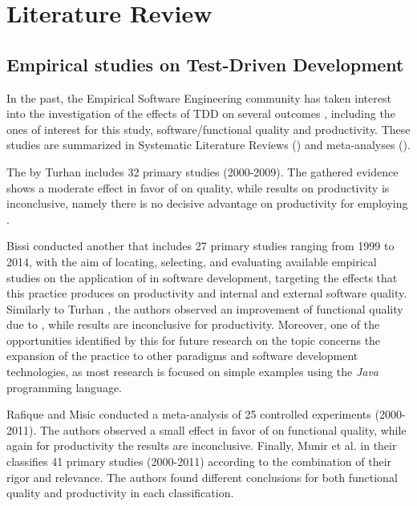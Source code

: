 \chapter{Literature Review}
\section{Empirical studies on Test-Driven Development}
In the past, the Empirical Software Engineering community has taken interest into the investigation of the effects of TDD on several outcomes \cite{DBLP:conf/esem/FucciS0SSUTJO16} \cite{DBLP:journals/tse/ErdogmusMT05} \cite{DBLP:journals/infsof/Madeyski10}, including the ones of interest for this study, \ie software/functional quality and productivity. These studies are summarized in Systematic Literature Reviews (\slrs) and meta-analyses (\eg \cite{DBLP:journals/infsof/BissiNE16, DBLP:journals/infsof/MunirMP14, DBLP:journals/tse/RafiqueM13, TDDEffective}).

The \slr by Turhan \etal \cite{TDDEffective} includes 32 primary studies (2000-2009). The gathered evidence shows a moderate effect in favor of \tdd on quality, while results on productivity is inconclusive, namely there is no decisive advantage on productivity for employing \tdd. 

Bissi \etal \cite{DBLP:journals/infsof/BissiNE16} conducted another \slr that includes 27 primary studies ranging from 1999 to 2014, with the aim of locating, selecting, and evaluating available empirical studies on the application of \tdd in software development, targeting the effects that this practice produces on productivity and internal and external software quality. Similarly to Turhan \etal \cite{TDDEffective}, the authors observed an improvement of functional quality due to \tdd, while results are inconclusive for productivity. Moreover, one of the opportunities identified by this \slr for future research on the topic concerns the expansion of the \tdd practice to other paradigms and software development technologies, as most research is focused on simple examples using the \textit{Java} programming language.

Rafique and Misic \cite{DBLP:journals/tse/RafiqueM13} conducted a meta-analysis of 25 controlled experiments (2000-2011). The authors observed a small effect in favor of \tdd on functional quality, while again for productivity the results are inconclusive. 
Finally, Munir et al. \cite{DBLP:journals/infsof/MunirMP14,} in their \slr classifies 41 primary studies (2000-2011) according to the combination of their rigor and relevance. The authors found different conclusions for both functional quality and productivity in each classification.

